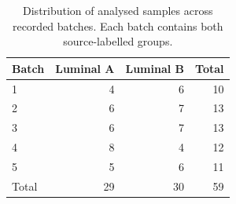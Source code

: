 \begin{table}[!htbp]
\centering
\caption{Distribution of analysed samples across recorded batches. Each batch contains both source-labelled groups.}
\label{tab:batch}
\begin{tabular}{@{}lrrr@{}}\toprule
Batch & Luminal A & Luminal B & Total\\\midrule
1 & 4 & 6 & 10\\
2 & 6 & 7 & 13\\
3 & 6 & 7 & 13\\
4 & 8 & 4 & 12\\
5 & 5 & 6 & 11\\
\midrule Total & 29 & 30 & 59\\\bottomrule
\end{tabular}
\end{table}
